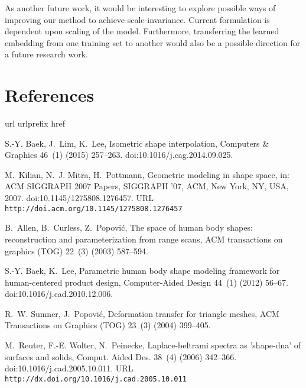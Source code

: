 \documentclass[5p,twocolumn,10pt,times]{elsarticle}
\begin{document}
As another future work, it would be interesting to explore possible ways of improving our method to achieve scale-invariance. Current formulation is dependent upon scaling of the model. Furthermore, transferring the learned embedding from one training set to another would also be a possible direction for a future research work.
\section*{References}

\begin{thebibliography}{10}
\expandafter\ifx\csname url\endcsname\relax
  \def\url#1{\texttt{#1}}\fi
\expandafter\ifx\csname urlprefix\endcsname\relax\def\urlprefix{URL }\fi
\expandafter\ifx\csname href\endcsname\relax
  \def\href#1#2{#2} \def\path#1{#1}\fi

S.-Y. Baek, J.~Lim, K.~Lee, Isometric shape interpolation, Computers \&
  Graphics 46~(1) (2015) 257--263.
\newblock \href{http://dx.doi.org/10.1016/j.cag.2014.09.025}{\path{doi:10.1016/j.cag.2014.09.025}}.

M.~Kilian, N.~J. Mitra, H.~Pottmann,
  \href{http://doi.acm.org/10.1145/1275808.1276457}{Geometric modeling in shape
  space}, in: ACM SIGGRAPH 2007 Papers, SIGGRAPH '07, ACM, New York, NY, USA,
  2007.
\newblock \href{http://dx.doi.org/10.1145/1275808.1276457}{\path{doi:10.1145/1275808.1276457}}.
\newline\urlprefix\url{http://doi.acm.org/10.1145/1275808.1276457}

B.~Allen, B.~Curless, Z.~Popovi{\'c}, The space of human body shapes:
  reconstruction and parameterization from range scans, ACM transactions on
  graphics (TOG) 22~(3) (2003) 587--594.

S.-Y. Baek, K.~Lee, Parametric human body shape modeling framework for
  human-centered product design, Computer-Aided Design 44~(1) (2012) 56--67.
\newblock \href{http://dx.doi.org/10.1016/j.cad.2010.12.006}{\path{doi:10.1016/j.cad.2010.12.006}}.

R.~W. Sumner, J.~Popovi{\'c}, Deformation transfer for triangle meshes, ACM
  Transactions on Graphics (TOG) 23~(3) (2004) 399--405.

M.~Reuter, F.-E. Wolter, N.~Peinecke,
  \href{http://dx.doi.org/10.1016/j.cad.2005.10.011}{Laplace-beltrami spectra
  as 'shape-dna' of surfaces and solids}, Comput. Aided Des. 38~(4) (2006)
  342--366.
\newblock \href{http://dx.doi.org/10.1016/j.cad.2005.10.011}{\path{doi:10.1016/j.cad.2005.10.011}}.
\newline\urlprefix\url{http://dx.doi.org/10.1016/j.cad.2005.10.011}


\end{thebibliography}
\end{document}

